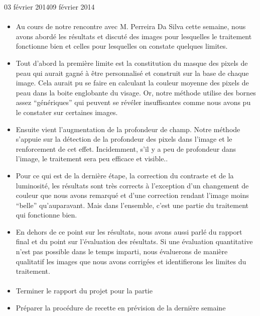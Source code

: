 \documentclass[12pt]{fiche-rd-info}
\begin{document}
\begin{fichesuivi}{03 février 2014}{09 février 2014}
\paragraph{}
	\begin{echange}
		\begin{itemize}
			\item Au cours de notre rencontre avec M. Perreira Da Silva cette semaine, nous avons abordé les résultats et discuté des images pour lesquelles le traitement fonctionne bien et celles pour lesquelles on constate quelques limites.
			\item Tout d’abord la première limite est la constitution du masque des pixels de peau qui aurait gagné à être personnalisé et construit sur la base de chaque image. Cela aurait pu se faire en calculant la couleur moyenne des pixels de peau dans la boite englobante du visage. Or, notre méthode utilise des bornes assez “génériques” qui peuvent se révéler insuffisantes comme nous avons pu le constater sur certaines images.
			\item Ensuite vient l’augmentation de la profondeur de champ. Notre méthode s’appuie sur la détection de la profondeur des pixels dans l’image et le renforcement de cet effet. Incidemment, s’il y a peu de profondeur dans l’image, le traitement sera peu efficace et visible..
	\item Pour ce qui est de la dernière étape, la correction du contraste et de la luminosité, les résultats sont très corrects à l’exception d’un changement de couleur que nous avons remarqué et d’une correction rendant l’image moins “belle” qu’auparavant. Mais dans l’ensemble, c’est une partie du traitement qui fonctionne bien.
	\item En dehors de ce point sur les résultats, nous avons aussi parlé du rapport final et du point sur l’évaluation des résultats. Si une évaluation quantitative n’est pas possible dans le temps imparti, nous évaluerons de manière qualitatif les images que nous avons corrigées et identifierons les limites du traitement.
		\end{itemize}
	\end{echange}

\paragraph*{}
	\begin{planification}
		\begin{itemize}
			\item Terminer le rapport du projet pour la partie 
			\item Préparer la procédure de recette en prévision de la dernière semaine
\end{itemize}
	\end{planification}
\end{fichesuivi}
\end{document}
